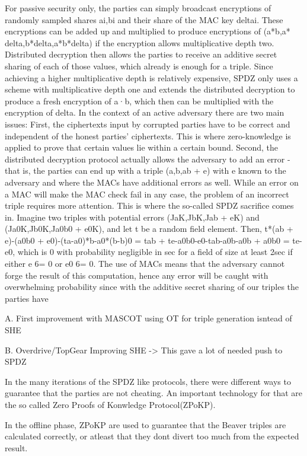 \documentclass[english,runningheads,a4paper]{llncs}[2018/03/10]
\begin{document}
For passive security only, the parties can simply broadcast encryptions of randomly sampled shares ai,bi and their share of the MAC key deltai. These encryptions can be added up and multiplied to produce encryptions of (a*b,a* delta,b*delta,a*b*delta) if the encryption allows multiplicative depth two. Distributed decryption then allows the parties to receive an additive secret sharing of each of those values, which already is enough for a triple. Since achieving a higher multiplicative depth is relatively expensive, SPDZ only uses a scheme with multiplicative depth one and extends the distributed decryption to produce a fresh encryption of a·b, which then can be multiplied with the encryption of delta. In the context of an active adversary there are two main issues: First, the ciphertexts input by corrupted parties have to be correct and independent of the honest parties’ ciphertexts. This is where zero-knowledge is applied to prove that certain values lie within a certain bound. Second, the distributed decryption protocol actually allows the adversary to add an error - that is, the parties can end up with a triple (a,b,ab + e) with e known to the adversary and where the MACs have additional errors as well. While an error on a MAC will make the MAC check fail in any case, the problem of an incorrect triple requires more attention. This is where the so-called SPDZ sacrifice comes in. Imagine two triples with potential errors (JaK,JbK,Jab + eK) and (Ja0K,Jb0K,Ja0b0 + e0K), and let t be a random field element. Then, t*(ab + e)-(a0b0 + e0)-(ta-a0)*b-a0*(b-b)0 = tab + te-a0b0-e0-tab-a0b-a0b + a0b0 = te-e0, which is 0 with probability negligible in sec for a field of size at least 2sec if either e 6= 0 or e0 6= 0. The use of MACs means that the adversary cannot forge the result of this computation, hence any error will be caught with overwhelming probability since with the additive secret sharing of our triples the parties have





A. First improvement with MASCOT
using OT for triple generation isntead of SHE

B. Overdrive/TopGear
Improving SHE -> This gave a lot of needed push to SPDZ

In the many iterations of the SPDZ like protocols, there were different ways to guarantee that the parties are not cheating. An important technology for that are the so called Zero Proofs of Konwledge Protocol(ZPoKP).

In the offline phase, ZPoKP are used to guarantee that the Beaver triples are calculated correctly, or atleast that they dont divert too much from the expected result.
\end{document}
